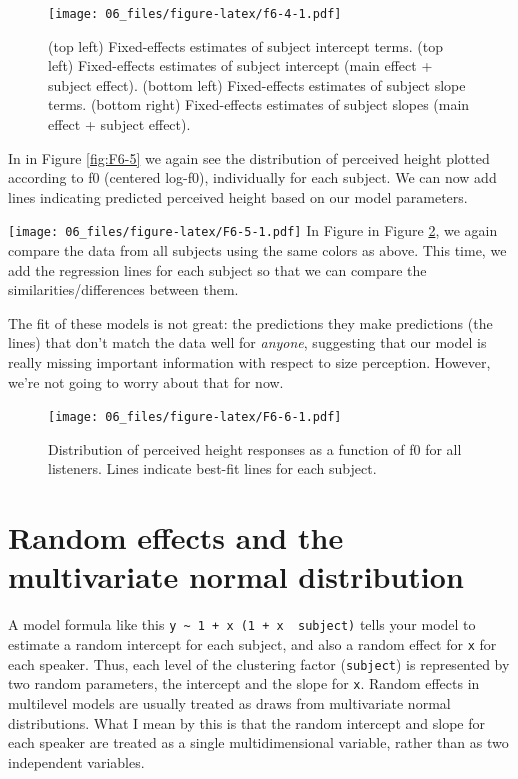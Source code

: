 \documentclass[
]{book}
\begin{document}
\begin{figure}
\centering
\texttt{[image: 06\_files/figure-latex/f6-4-1.pdf]}
\caption{\label{fig:f6-4}(top left) Fixed-effects estimates of subject intercept terms. (top left) Fixed-effects estimates of subject intercept (main effect + subject effect). (bottom left) Fixed-effects estimates of subject slope terms. (bottom right) Fixed-effects estimates of subject slopes (main effect + subject effect).}
\end{figure}

In in Figure \ref{fig:F6-5} we again see the distribution of perceived height plotted according to f0 (centered log-f0), individually for each subject. We can now add lines indicating predicted perceived height based on our model parameters.

\texttt{[image: 06\_files/figure-latex/F6-5-1.pdf]}
In Figure in Figure \ref{fig:F6-6}, we again compare the data from all subjects using the same colors as above. This time, we add the regression lines for each subject so that we can compare the similarities/differences between them.

The fit of these models is not great: the predictions they make predictions (the lines) that don't match the data well for \emph{anyone}, suggesting that our model is really missing important information with respect to size perception. However, we're not going to worry about that for now.

\begin{figure}
\centering
\texttt{[image: 06\_files/figure-latex/F6-6-1.pdf]}
\caption{\label{fig:F6-6}Distribution of perceived height responses as a function of f0 for all listeners. Lines indicate best-fit lines for each subject.}
\end{figure}

\hypertarget{random-effects-and-the-multivariate-normal-distribution}{%
\section{Random effects and the multivariate normal distribution}\label{random-effects-and-the-multivariate-normal-distribution}}

A model formula like this \texttt{y\ \textasciitilde{}\ 1\ +\ x\ (1\ +\ x\ \textbar{}\ subject)} tells your model to estimate a random intercept for each subject, and also a random effect for \texttt{x} for each speaker. Thus, each level of the clustering factor (\texttt{subject}) is represented by two random parameters, the intercept and the slope for \texttt{x}. Random effects in multilevel models are usually treated as draws from multivariate normal distributions. What I mean by this is that the random intercept and slope for each speaker are treated as a single multidimensional variable, rather than as two independent variables.
\end{document}
